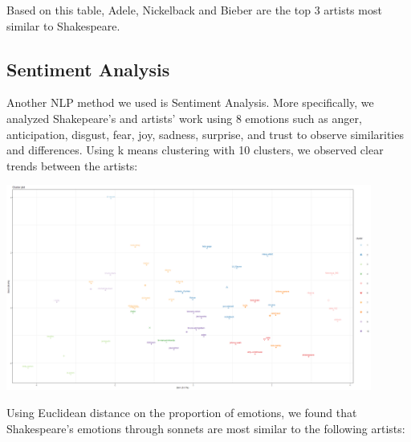 \documentclass[10pt,a4paper]{article}
\begin{document}

Based on this table, Adele, Nickelback and Bieber are the top 3 artists most similar to Shakespeare.

\subsection{Sentiment Analysis}

Another NLP method we used is Sentiment Analysis. More specifically, we analyzed Shakepeare's and artists' work using 8 emotions such as anger, anticipation, disgust, fear, joy, sadness, surprise, and trust to observe similarities and differences. Using k means clustering with 10 clusters, we observed clear trends between the artists:

\begin{center}
\includegraphics[width=12cm]{_assets/ClusterAnalysis_Fit10.png}
\end{center}

Using Euclidean distance on the proportion of emotions, we found that Shakespeare's emotions through sonnets are most similar to the following artists:

\begin{table}[ht]
\centering
{}
\caption{Ranked Top 10 Most Similar Music Artist to Shakespeare Based on Sentiments} 
\label{tab:wordranktable}
\end{table}
\end{document}
